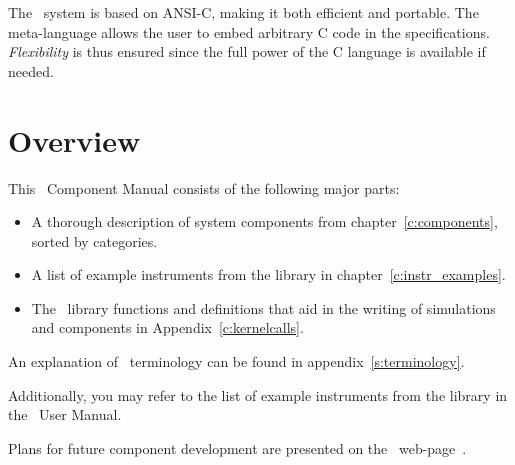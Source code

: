 The \MCS\ system is based on ANSI-C, making it both efficient and
portable. The meta-language allows the user to embed arbitrary C code in
the specifications. \textit{Flexibility} is thus ensured since the full
power of the C language is available if needed.


\section{Overview}

This \MCS\ Component Manual consists of the following major parts:
\begin{itemize}
\item A thorough description of system components 
from chapter~\ref{c:components}, sorted by categories. 
\item A list of example instruments from the library in chapter~\ref{c:instr_examples}. 
\item The \MCS\ library functions and definitions
  that aid in the writing of simulations and components in
  Appendix~\ref{c:kernelcalls}.    
\end{itemize}
An explanation of \MCS\ terminology can be
found in appendix~\ref{s:terminology}.

Additionally, you may refer to the list of example instruments from the library in the \MCS\ User Manual.

Plans for future component development are presented 
on the \MCS\ web-page~\cite{mcstas_webpage}.




